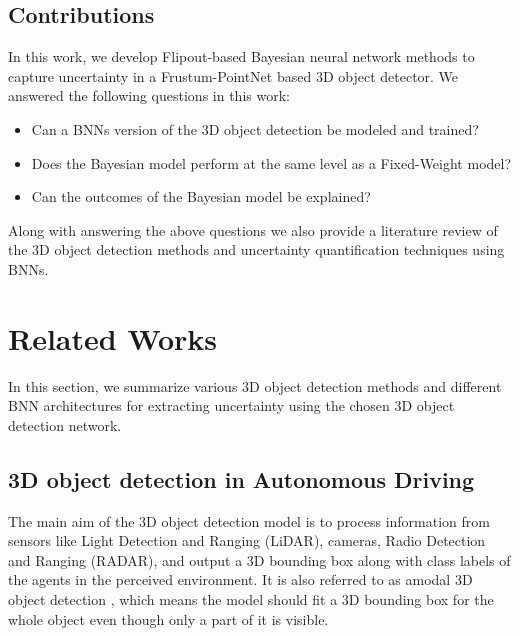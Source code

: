 \documentclass[10pt,twocolumn,letterpaper]{article}
\begin{document}
\subsection{Contributions}
In this work, we develop Flipout-based Bayesian neural network \cite{Wen2018} methods to capture uncertainty in a Frustum-PointNet based 3D object detector. We answered the following questions in this work:
\begin{itemize}
    \item Can a BNNs version of the 3D object detection be modeled and trained?
    \item Does the Bayesian model perform at the same level as a Fixed-Weight model?
    \item Can the outcomes of the Bayesian model be explained?
\end{itemize}
    
    Along with answering the above questions we also provide a literature review of the 3D object detection methods and uncertainty quantification techniques using BNNs.
\section{Related Works}
In this section, we summarize various 3D object detection methods and different BNN architectures for extracting uncertainty using the chosen 3D object detection network.

\subsection{3D object detection in Autonomous Driving}
The main aim of the 3D object detection model is to process information from sensors like Light Detection and Ranging (LiDAR), cameras, Radio Detection and Ranging (RADAR), and output a 3D bounding box along with class labels of the agents in the perceived environment. It is also referred to as amodal 3D object detection \cite{Arnold2019}, which means the model should fit a 3D bounding box for the whole object even though only a part of it is visible.

\end{document}
